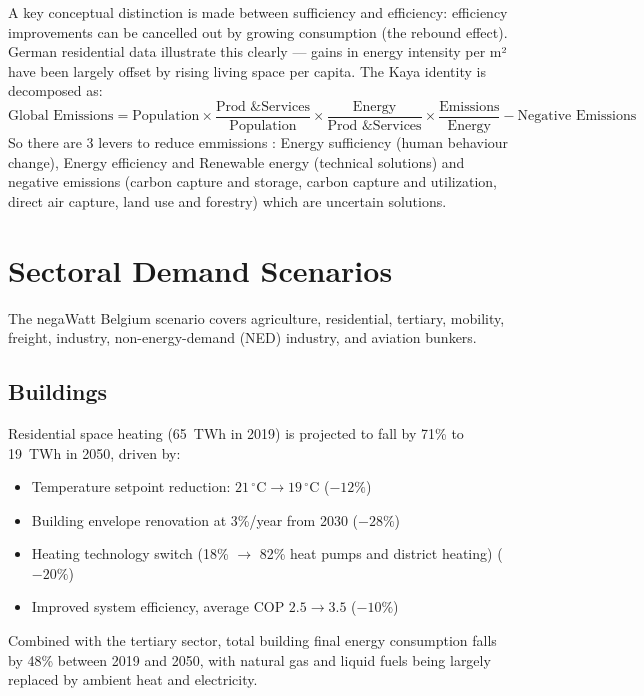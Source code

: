 A key conceptual distinction is made between sufficiency and efficiency: efficiency
improvements can be cancelled out by growing consumption (the rebound effect). German
residential data illustrate this clearly --- gains in energy intensity per m² have
been largely offset by rising living space per capita. The Kaya identity is decomposed as:
\[
\text{Global Emissions} = \text{Population} \times \frac{\text{Prod \& Services}}{\text{Population}} \times \frac{\text{Energy}}{\text{Prod \& Services}} \times \frac{\text{Emissions}}{\text{Energy}} - \text{Negative Emissions}
\]
So there are 3 levers to reduce emmissions : Energy sufficiency (human behaviour change), Energy efficiency and Renewable energy (technical solutions) and negative emissions (carbon capture and storage, carbon capture and utilization, direct air capture, land use and forestry) which are uncertain solutions.

\section{Sectoral Demand Scenarios}

The negaWatt Belgium scenario covers agriculture, residential, tertiary, mobility,
freight, industry, non-energy-demand (NED) industry, and aviation bunkers.

\subsection{Buildings}

Residential space heating (65~TWh in 2019) is projected to fall by 71\% to
19~TWh in 2050, driven by:

\begin{itemize}[noitemsep]
    \item Temperature setpoint reduction: $21\,^\circ\text{C} \to 19\,^\circ\text{C}$ ($-12\%$)
    \item Building envelope renovation at 3\%/year from 2030 ($-28\%$)
    \item Heating technology switch (18\% $\to$ 82\% heat pumps and district heating) ($-20\%$)
    \item Improved system efficiency, average COP $2.5 \to 3.5$ ($-10\%$)
\end{itemize}

Combined with the tertiary sector, total building final energy consumption falls by
48\% between 2019 and 2050, with natural gas and liquid fuels being largely replaced
by ambient heat and electricity.

